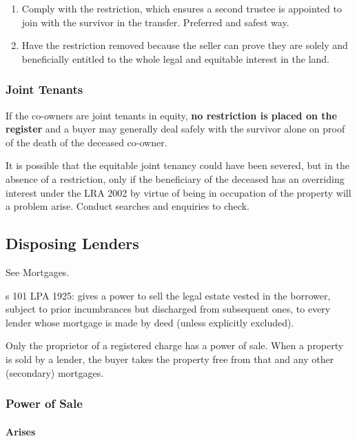 \documentclass[
]{article}
\providecommand{\tightlist}{%
  \setlength{\itemsep}{0pt}\setlength{\parskip}{0pt}}
\begin{document}
\begin{enumerate}
\tightlist
\item
  Comply with the restriction, which ensures a second trustee is
  appointed to join with the survivor in the transfer. Preferred and
  safest way.
\item
  Have the restriction removed because the seller can prove they are
  solely and beneficially entitled to the whole legal and equitable
  interest in the land.
\end{enumerate}

\hypertarget{joint-tenants}{%
\subsubsection{Joint Tenants}\label{joint-tenants}}

If the co-owners are joint tenants in equity, \textbf{no restriction is
placed on the register} and a buyer may generally deal safely with the
survivor alone on proof of the death of the deceased co-owner.

It is possible that the equitable joint tenancy could have been severed,
but in the absence of a restriction, only if the beneficiary of the
deceased has an overriding interest under the LRA 2002 by virtue of
being in occupation of the property will a problem arise. Conduct
searches and enquiries to check.

\hypertarget{disposing-lenders}{%
\subsection{Disposing Lenders}\label{disposing-lenders}}

See Mortgages.

s 101 LPA 1925: gives a power to sell the legal estate vested in the
borrower, subject to prior incumbrances but discharged from subsequent
ones, to every lender whose mortgage is made by deed (unless explicitly
excluded).

Only the proprietor of a registered charge has a power of sale. When a
property is sold by a lender, the buyer takes the property free from
that and any other (secondary) mortgages.

\hypertarget{power-of-sale}{%
\subsubsection{Power of Sale}\label{power-of-sale}}

\hypertarget{arises}{%
\paragraph{Arises}\label{arises}}
\end{document}
